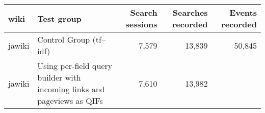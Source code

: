 \documentclass[12pt,]{article}
\begin{document}
\begin{longtable}[]{@{}llrrr@{}}
\toprule
\begin{minipage}[b]{0.07\columnwidth}\raggedright\strut
wiki\strut
\end{minipage} & \begin{minipage}[b]{0.46\columnwidth}\raggedright\strut
Test group\strut
\end{minipage} & \begin{minipage}[b]{0.11\columnwidth}\raggedleft\strut
Search sessions\strut
\end{minipage} & \begin{minipage}[b]{0.12\columnwidth}\raggedleft\strut
Searches recorded\strut
\end{minipage} & \begin{minipage}[b]{0.11\columnwidth}\raggedleft\strut
Events recorded\strut
\end{minipage}\tabularnewline
\midrule
\endhead
\begin{minipage}[t]{0.07\columnwidth}\raggedright\strut
jawiki\strut
\end{minipage} & \begin{minipage}[t]{0.46\columnwidth}\raggedright\strut
Control Group (tf--idf)\strut
\end{minipage} & \begin{minipage}[t]{0.11\columnwidth}\raggedleft\strut
7,579\strut
\end{minipage} & \begin{minipage}[t]{0.12\columnwidth}\raggedleft\strut
13,839\strut
\end{minipage} & \begin{minipage}[t]{0.11\columnwidth}\raggedleft\strut
50,845\strut
\end{minipage}\tabularnewline
\begin{minipage}[t]{0.07\columnwidth}\raggedright\strut
jawiki\strut
\end{minipage} & \begin{minipage}[t]{0.46\columnwidth}\raggedright\strut
Using per-field query builder with incoming links and pageviews as
QIFs\strut
\end{minipage} & \begin{minipage}[t]{0.11\columnwidth}\raggedleft\strut
7,610\strut
\end{minipage} & \begin{minipage}[t]{0.12\columnwidth}\raggedleft\strut
13,982\strut
\end{minipage} & \begin{minipage}[t]{0.11\columnwidth}\raggedleft\strut

\end{minipage}
\end{longtable}
\end{document}
